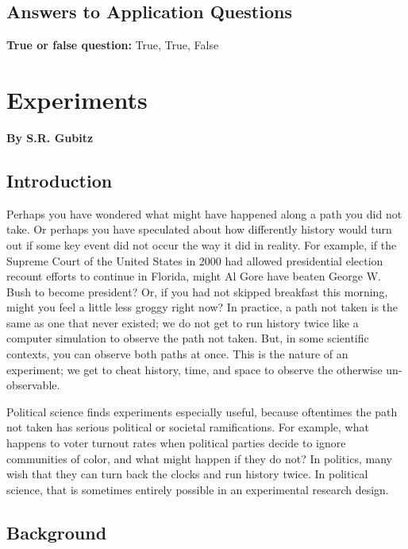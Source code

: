 \documentclass{book}
\begin{document}
\hypertarget{answers-to-application-questions-4}{%
\section{Answers to Application
Questions}\label{answers-to-application-questions-4}}

\textbf{True or false question:} True, True, False

\hypertarget{experiments}{%
\chapter{Experiments}\label{experiments}}

\textbf{By S.R. Gubitz}

\hypertarget{introduction-5}{%
\section{Introduction}\label{introduction-5}}

Perhaps you have wondered what might have happened along a path you did not
take. Or perhaps you have speculated about how differently history would turn
out if some key event did not occur the way it did in reality. For example, if
the Supreme Court of the United States in 2000 had allowed presidential
election recount efforts to continue in Florida, might Al Gore have beaten
George W. Bush to become president? Or, if you had not skipped breakfast this
morning, might you feel a little less groggy right now? In practice, a path
not taken is the same as one that never existed; we do not get to run history
twice like a computer simulation to observe the path not taken. But, in some
scientific contexts, you can observe both paths at once. This is the nature of
an experiment; we get to cheat history, time, and space to observe the
otherwise un-observable.

Political science finds experiments especially useful, because oftentimes the
path not taken has serious political or societal ramifications. For example,
what happens to voter turnout rates when political parties decide to ignore
communities of color, and what might happen if they do not? In politics, many
wish that they can turn back the clocks and run history twice. In political
science, that is sometimes entirely possible in an experimental research
design.

\hypertarget{background-1}{%
\section{Background}\label{background-1}}
\end{document}

